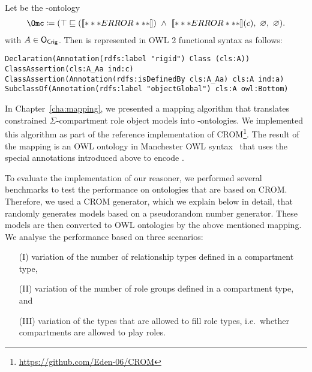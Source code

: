 \begin{example}\label{ex:outer-abstraction-as-OWL-w-global}
  Let \Omc be the \ALCALC-ontology
  \begin{align*}
    \Omc \coloneqq (\top\sqsubseteq(\oax{A\sqsubseteq\bot})\ \land\ \oax{A(a)}(c),\ \emptyset,\ \emptyset).
  \end{align*}
  with $A\in\mathsf{O_{Crig}}$. Then \Omc is represented in OWL 2 functional syntax as follows:

\smallskip\noindent
\verb+Declaration(Annotation(rdfs:label "rigid") Class (cls:A))+\\
\verb+ClassAssertion(cls:A_Aa ind:c)+\\
\verb+ClassAssertion(Annotation(rdfs:isDefinedBy cls:A_Aa) cls:A ind:a)+\\
\verb+SubclassOf(Annotation(rdfs:label "objectGlobal") cls:A owl:Bottom)+
\end{example}

In Chapter~\ref{cha:mapping}, we presented a mapping algorithm that translates constrained
$\Sigma$-compartment role object models into \LMLO-ontologies. We implemented this algorithm as part
of the reference implementation of CROM\footnote{\url{https://github.com/Eden-06/CROM}}. The result
of the mapping is an OWL ontology in Manchester OWL syntax~\cite{HoP-OWL2Man12} that uses the
special annotations introduced above to encode \LMLO.

To evaluate the implementation of our reasoner, we performed several benchmarks to test the
performance on ontologies that are based on CROM. Therefore, we used a CROM generator, which we explain
below in detail, that randomly generates models based on a pseudorandom number generator. These models are
then converted to OWL ontologies by the above mentioned mapping. We analyse the performance based on
three scenarios:
\begin{enumerate}[leftmargin=30pt]
\item[(I)] variation of the number of relationship types defined in a compartment type,
\item[(II)] variation of the number of role groups defined in a compartment type, and
\item[(III)] variation of the types that are allowed to fill role types, i.e.\ whether compartments
  are allowed to play roles.
\end{enumerate}


